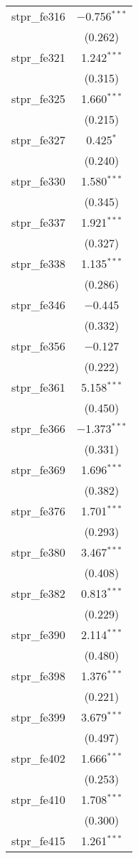 \begin{table}[!htbp]
\begin{tabular}{@{\extracolsep{5pt}}lc}
  stpr\_fe316 & $-$0.756$^{***}$ \\ 
  & (0.262) \\ 
  stpr\_fe321 & 1.242$^{***}$ \\ 
  & (0.315) \\ 
  stpr\_fe325 & 1.660$^{***}$ \\ 
  & (0.215) \\ 
  stpr\_fe327 & 0.425$^{*}$ \\ 
  & (0.240) \\ 
  stpr\_fe330 & 1.580$^{***}$ \\ 
  & (0.345) \\ 
  stpr\_fe337 & 1.921$^{***}$ \\ 
  & (0.327) \\ 
  stpr\_fe338 & 1.135$^{***}$ \\ 
  & (0.286) \\ 
  stpr\_fe346 & $-$0.445 \\ 
  & (0.332) \\ 
  stpr\_fe356 & $-$0.127 \\ 
  & (0.222) \\ 
  stpr\_fe361 & 5.158$^{***}$ \\ 
  & (0.450) \\ 
  stpr\_fe366 & $-$1.373$^{***}$ \\ 
  & (0.331) \\ 
  stpr\_fe369 & 1.696$^{***}$ \\ 
  & (0.382) \\ 
  stpr\_fe376 & 1.701$^{***}$ \\ 
  & (0.293) \\ 
  stpr\_fe380 & 3.467$^{***}$ \\ 
  & (0.408) \\ 
  stpr\_fe382 & 0.813$^{***}$ \\ 
  & (0.229) \\ 
  stpr\_fe390 & 2.114$^{***}$ \\ 
  & (0.480) \\ 
  stpr\_fe398 & 1.376$^{***}$ \\ 
  & (0.221) \\ 
  stpr\_fe399 & 3.679$^{***}$ \\ 
  & (0.497) \\ 
  stpr\_fe402 & 1.666$^{***}$ \\ 
  & (0.253) \\ 
  stpr\_fe410 & 1.708$^{***}$ \\ 
  & (0.300) \\ 
  stpr\_fe415 & 1.261$^{***}$ \\ 

\end{tabular}
\end{table}
